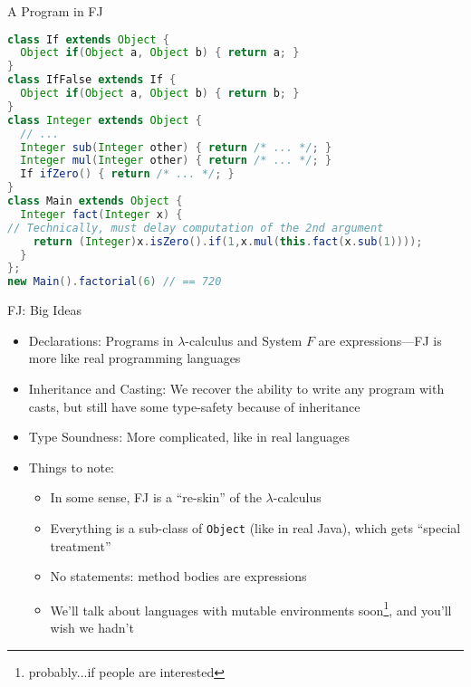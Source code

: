 \documentclass[leqno,presentation,usenames,dvipsnames]{beamer}
\begin{document}
\begin{frame}[fragile]{A Program in FJ}
\begin{lstlisting}[language=java, basicstyle=\scriptsize\ttfamily]
class If extends Object {
  Object if(Object a, Object b) { return a; }
}
class IfFalse extends If {
  Object if(Object a, Object b) { return b; }
}
class Integer extends Object {
  // ...
  Integer sub(Integer other) { return /* ... */; }
  Integer mul(Integer other) { return /* ... */; }
  If ifZero() { return /* ... */; }
}
class Main extends Object {
  Integer fact(Integer x) {
// Technically, must delay computation of the 2nd argument
    return (Integer)x.isZero().if(1,x.mul(this.fact(x.sub(1))));
  }
};
new Main().factorial(6) // == 720
\end{lstlisting}
\end{frame}

\begin{frame}[fragile]{FJ: Big Ideas}
    \begin{itemize}
        \item Declarations: Programs in $\lambda$-calculus and System $F$ are expressions---FJ is more like real programming languages
        \item Inheritance and Casting: We recover the ability to write any program with casts, but still have some type-safety because of inheritance
        \item Type Soundness: More complicated, like in real languages
        \item Things to note:
            \begin{itemize}
                \item In some sense, FJ is a ``re-skin'' of the $\lambda$-calculus
                \item Everything is a sub-class of \texttt{Object} (like in real Java), which gets ``special treatment''
                \item No statements: method bodies are expressions
                \item We'll talk about languages with mutable environments soon\footnote{probably...if people are interested}, and you'll wish we hadn't
            \end{itemize}
    \end{itemize}
\end{frame}
\end{document}

